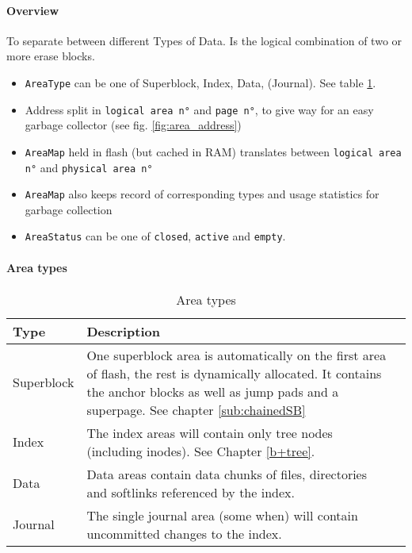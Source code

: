 \paragraph{Overview}
To separate between different Types of Data. Is the logical combination of two or more erase blocks.
\begin{itemize}
	\item \texttt{AreaType} can be one of Superblock, Index, Data, (Journal). See table \ref{tab:areatypes}.
	\item Address split in \texttt{logical area n°} and \texttt{page n°}, to give way for an easy garbage collector (see  fig. \ref{fig:area_address})
	\item \texttt{AreaMap} held in flash (but cached in RAM) translates between \texttt{logical area n°} and \texttt{physical area n°}
	\item \texttt{AreaMap} also keeps record of corresponding types and usage statistics for garbage collection
	\item\texttt{AreaStatus} can be one of \texttt{closed}, \texttt{active} and \texttt{empty}. 
\end{itemize}

\paragraph{Area types}
\begin{table}[htbp]
\caption{Area types}
\label{tab:areatypes}
\begin{tabularx}{\textwidth}{lp{11cm}p{2.5cm}}
\toprule
Type & Description\\
\midrule
Superblock & One superblock area is automatically on the first area of flash, the rest is dynamically allocated. It contains the anchor blocks as well as jump pads and a superpage. See chapter \ref{sub:chainedSB} \\
Index & The index areas will contain only tree nodes (including inodes). See Chapter \ref{b+tree}.\\
Data & Data areas contain data chunks of files, directories and softlinks referenced by the index.\\
Journal & The single journal area (some when) will contain uncommitted changes to the index.\\
\bottomrule
\end{tabularx}
\end{table} 

